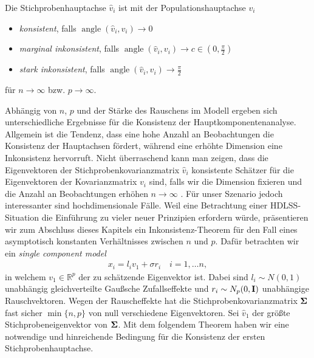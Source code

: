 \begin{defn}
Die Stichprobenhauptachse $\hat{v}_i$ ist mit der Populationshauptachse $v_i$
\begin{itemize}
\item \textit{konsistent}, falls $\operatorname{angle}(\widehat{v}_i, v_i) \longrightarrow 0$
\item \textit{marginal inkonsistent}, falls $\operatorname{angle}(\widehat{v}_i, v_i) \longrightarrow c \in (0,\frac{\pi}{2})$
\item \textit{stark inkonsistent}, falls $\operatorname{angle}(\widehat{v}_i, v_i) \longrightarrow \frac{\pi}{2}$
\end{itemize} 
für $n \to \infty$ bzw. $p \rightarrow \infty$. 
\end{defn}

Abhängig von $n$, $p$ und der Stärke des Rauschens im Modell ergeben sich unterschiedliche Ergebnisse für die Konsistenz der Hauptkomponentenanalyse. Allgemein ist die Tendenz, dass eine hohe Anzahl an Beobachtungen die Konsistenz der Hauptachsen fördert, während eine erhöhte Dimension eine Inkonsistenz hervorruft. Nicht überraschend kann man zeigen, dass die Eigenvektoren der Stichprobenkovarianzmatrix $\widehat{v}_i$ konsistente Schätzer für die Eigenvektoren der Kovarianzmatrix $v_i$ sind, falls wir die Dimension fixieren und die Anzahl an Beobachtungen erhöhen $n \rightarrow \infty$ \cite{anderson}. Für unser Szenario jedoch interessanter sind hochdimensionale Fälle. Weil eine Betrachtung einer HDLSS-Situation die Einführung zu vieler neuer Prinzipien erfordern würde, präsentieren wir zum Abschluss dieses Kapitels ein Inkonsistenz-Theorem für den Fall eines asymptotisch konstanten Verhältnisses zwischen $n$ und $p$. Dafür betrachten wir ein \textit{single component model} \cite{johnstone}
\begin{align}
\label{single_component_model}
x_i = l_i v_1 + \sigma r_i \quad i = 1, \ldots n,
\end{align}
in welchem $v_1 \in \mathbb{R}^p$ der zu schätzende Eigenvektor ist. Dabei sind $l_i \sim N(0,1)$ unabhängig gleichverteilte Gaußsche Zufallseffekte und $r_i \sim N_p(0, \mathbf{I})$ unabhängige Rauschvektoren. Wegen der Rauscheffekte hat die Stichprobenkovarianzmatrix $\mathbf{\Sigma}$ fast sicher $\min\{n,p\}$ von null verschiedene Eigenvektoren. Sei $\widehat{v}_1$ der größte Stichprobeneigenvektor von $\mathbf{\Sigma}$. Mit dem folgendem Theorem haben wir eine notwendige und hinreichende Bedingung für die Konsistenz der ersten Stichprobenhauptachse.

